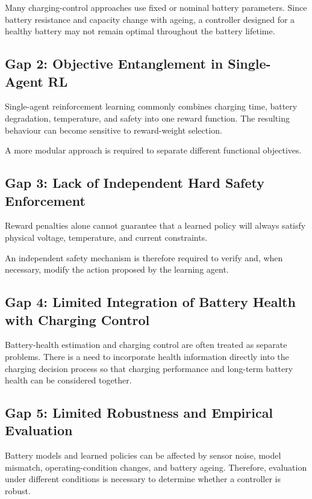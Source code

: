 Many charging-control approaches use fixed or nominal battery
parameters. Since battery resistance and capacity change with ageing,
a controller designed for a healthy battery may not remain optimal
throughout the battery lifetime.

\subsection{Gap 2: Objective Entanglement in Single-Agent RL}

Single-agent reinforcement learning commonly combines charging time,
battery degradation, temperature, and safety into one reward function.
The resulting behaviour can become sensitive to reward-weight
selection.

A more modular approach is required to separate different functional
objectives.

\subsection{Gap 3: Lack of Independent Hard Safety Enforcement}

Reward penalties alone cannot guarantee that a learned policy will
always satisfy physical voltage, temperature, and current constraints.

An independent safety mechanism is therefore required to verify and,
when necessary, modify the action proposed by the learning agent.

\subsection{Gap 4: Limited Integration of Battery Health with Charging Control}

Battery-health estimation and charging control are often treated as
separate problems. There is a need to incorporate health information
directly into the charging decision process so that charging
performance and long-term battery health can be considered together.

\subsection{Gap 5: Limited Robustness and Empirical Evaluation}

Battery models and learned policies can be affected by sensor noise,
model mismatch, operating-condition changes, and battery ageing.
Therefore, evaluation under different conditions is necessary to
determine whether a controller is robust.

